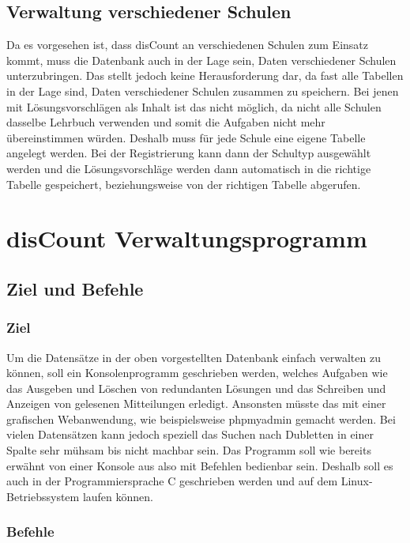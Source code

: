 \documentclass[12pt]{report}
\begin{document}
\chapter{Verwaltung verschiedener Schulen}
Da es vorgesehen ist, dass disCount an verschiedenen Schulen zum Einsatz kommt, muss die Datenbank auch in der Lage sein, Daten verschiedener Schulen unterzubringen. Das stellt jedoch keine Herausforderung dar, da fast alle Tabellen in der Lage sind, Daten verschiedener Schulen zusammen zu speichern. Bei jenen mit Lösungsvorschlägen als Inhalt ist das nicht möglich, da nicht alle Schulen dasselbe Lehrbuch verwenden und somit die Aufgaben nicht mehr übereinstimmen würden. Deshalb muss für jede Schule eine eigene Tabelle angelegt werden. Bei der Registrierung kann dann der Schultyp ausgewählt werden und die Lösungsvorschläge werden dann automatisch in die richtige Tabelle gespeichert, beziehungsweise von der richtigen Tabelle abgerufen.
  

\part{disCount Verwaltungsprogramm}

\chapter{Ziel und Befehle}

\section{Ziel}
Um die Datensätze in der oben vorgestellten Datenbank einfach verwalten zu können, soll ein Konsolenprogramm geschrieben werden, welches Aufgaben wie das Ausgeben und Löschen von redundanten Lösungen und das Schreiben und Anzeigen von gelesenen Mitteilungen erledigt. Ansonsten müsste das mit einer grafischen Webanwendung, wie beispielsweise phpmyadmin gemacht werden. Bei vielen Datensätzen kann jedoch speziell das Suchen nach Dubletten in einer Spalte sehr mühsam bis nicht machbar sein. Das Programm soll wie bereits erwähnt von einer Konsole aus also mit Befehlen bedienbar sein. Deshalb soll es auch in der Programmiersprache C geschrieben werden und auf dem Linux-Betriebssystem laufen können.

\section{Befehle}
\end{document}
